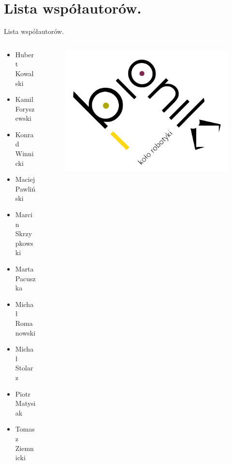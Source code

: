 \documentclass{beamer}
\begin{document}
\section{Lista współautorów.}
\begin{frame}{Lista współautorów.}
	
	\begin{columns}[T]
		\begin{column}{.5\textwidth}
			\begin{itemize}
				\item Hubert Kowalski 
				\item Kamil Foryszewski 
				\item Konrad Winnicki 
				\item Maciej Pawliński 
				\item Marcin Skrzypkowski 
				\item Marta Pacuszka 
				\item Michał Romanowski 
				\item Michał Stolarz 
				\item Piotr Matysiak 
				\item Tomasz Ziemnicki 
			\end{itemize}
		\end{column}
		\begin{column}{.5\textwidth}
			\begin{figure}
				\includegraphics[width=1\textwidth]{img/logo.png}
			\end{figure}
		\end{column}
	\end{columns}
\end{frame}
\end{document}
